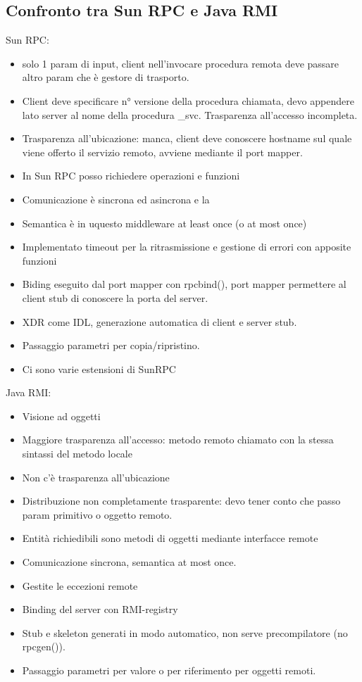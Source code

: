 \documentclass[16px]{article}
\begin{document}
\subsection{Confronto tra Sun RPC e Java RMI}
Sun RPC: 
\begin{itemize}
\item solo 1 param di input, client nell'invocare procedura remota deve passare altro param che è gestore di trasporto. 
\item Client deve specificare n° versione della procedura chiamata, devo appendere lato server al nome della procedura \_svc. Trasparenza all'accesso incompleta.\\ 
\item Trasparenza all'ubicazione: manca, client deve conoscere hostname sul quale viene offerto il servizio remoto, avviene mediante il port mapper. 
\item In Sun RPC posso richiedere operazioni e funzioni
\item Comunicazione è sincrona ed asincrona e la 
\item Semantica è in uquesto middleware at least once (o at most once)
\item Implementato timeout per la ritrasmissione e gestione di errori con apposite funzioni
\item Biding eseguito dal port mapper con rpcbind(), port mapper permettere al client stub di conoscere la porta del server.
\item XDR come IDL, generazione automatica di client e server stub.
\item Passaggio parametri per copia/ripristino.
\item Ci sono varie estensioni di SunRPC
\end{itemize}
Java RMI:
\begin{itemize}
\item Visione ad oggetti
\item Maggiore trasparenza all'accesso: metodo remoto chiamato con la stessa sintassi del metodo locale
\item Non c'è trasparenza all'ubicazione
\item Distribuzione non completamente trasparente: devo tener conto che passo param primitivo o oggetto remoto.
\item Entità richiedibili sono metodi di oggetti mediante interfacce remote
\item Comunicazione sincrona, semantica at most once.
\item Gestite le eccezioni remote 
\item Binding del server con RMI-registry
\item Stub e skeleton generati in modo automatico, non serve precompilatore (no rpcgen()).
\item Passaggio parametri per valore o per riferimento per oggetti remoti.
\end{itemize}
\end{document}
